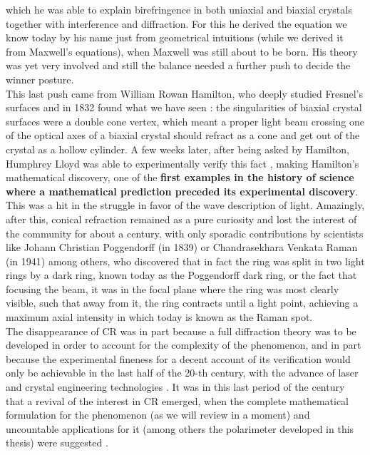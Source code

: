 \documentclass[11pt, a4paper, twoside]{article} %
\DeclareRobustCommand{\mybox}[2][gray!10]{%
\begin{tcolorbox}[   %
        left=0.2cm,
        right=0.2cm,
        top=0.15cm,
        bottom=0.15cm,
        colback=#1,
        colframe=#1,
        width=\dimexpr\textwidth\relax, 
        enlarge left by=0mm,
        boxsep=5pt,
        arc=0pt,outer arc=0pt,
        ]
        #2
\end{tcolorbox}
}
\begin{document}
\mybox{which he was able to explain birefringence in both uniaxial and biaxial crystals together with interference and diffraction. For this he derived the equation we know today by his name just from geometrical intuitions (while we derived it from Maxwell's equations), when Maxwell was still about to be born. His theory was yet very involved and still the balance needed a further push to decide the winner posture.\\

This last push came from William Rowan Hamilton, who deeply studied Fresnel's surfaces and in 1832 found what we have seen \cite{hamilton}: the singularities of biaxial crystal surfaces were a double cone vertex, which meant a proper light beam crossing one of the optical axes of a biaxial crystal should refract as a cone and get out of the crystal as a hollow cylinder. A few weeks later, after being asked by Hamilton, Humphrey Lloyd was able to experimentally verify this fact \cite{lloyd}, making Hamilton's mathematical discovery, one of the {\bf first examples in the history of science where a mathematical prediction preceded its experimental discovery}. This was a hit in the struggle in favor of the wave description of light. Amazingly, after this, conical refraction remained as a pure curiosity and lost the interest of the community for about a century, with only sporadic contributions by scientists like Johann Christian Poggendorff (in 1839) \cite{poggendorff} or Chandrasekhara Venkata Raman (in 1941) \cite{raman1,raman2} among others, who discovered that in fact the ring was split in two light rings by a dark ring, known today as the Poggendorff dark ring, or the fact that focusing the beam, it was in the focal plane where the ring was most clearly visible, such that away from it, the ring contracts until a light point, achieving a maximum axial intensity in which today is known as the Raman spot.\\ 

The disappearance of CR was in part because a full diffraction theory was to be developed in order to account for the complexity of the phenomenon, and in part because the experimental fineness for a decent account of its verification would only be achievable in the last half of the 20-th century, with the advance of laser and crystal engineering technologies \cite{Todor}. It was in this last period of the century that a revival of the interest in CR emerged, when the complete mathematical formulation for the phenomenon \cite{BK1, BK2, Berry, Jeffrey} (as we will review in a moment) and uncountable applications for it \cite{Turpin} (among others the polarimeter developed in this thesis) were suggested \cite{Stokes1, Stokes2, incomplete}.
}
\end{document}
